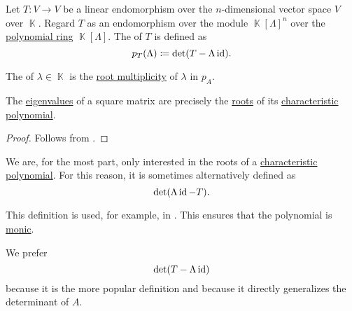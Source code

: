 \begin{definition}\label{def:characteristic_polynomial}\mimprovised
  Let \( T: V \to V \) be a linear endomorphism over the \( n \)-dimensional vector space \( V \) over \( \BbbK \). Regard \( T \) as an endomorphism over the module \( \BbbK[\Lambda]^n \) over the \hyperref[def:polynomial_algebra]{polynomial ring} \( \BbbK[\Lambda] \). The  of \( T \) is defined as
  \begin{equation*}
    p_T(\Lambda) \coloneqq \det(T - \Lambda \operatorname{id}).
  \end{equation*}

  The  of \( \lambda \in \BbbK \) is the \hyperref[def:multiple_root]{root multiplicity} of \( \lambda \) in \( p_A \).
\end{definition}

\begin{proposition}\label{thm:eigenvalues_and_characteristic_polynomials}
  The \hyperref[def:eigenpair]{eigenvalues} of a square matrix are precisely the \hyperref[def:multiple_root]{roots} of its \hyperref[def:characteristic_polynomial]{characteristic polynomial}.
\end{proposition}
\begin{proof}
  Follows from .
\end{proof}

\begin{remark}\label{rem:characteristic_polynomial}
  We are, for the most part, only interested in the roots of a \hyperref[def:characteristic_polynomial]{characteristic polynomial}. For this reason, it is sometimes alternatively defined as
  \begin{equation*}
    \det(\Lambda \operatorname{id} - T).
  \end{equation*}

  This definition is used, for example, in \cite[74]{Knapp2016BasicAlgebra}. This ensures that the polynomial is \hyperref[def:monic_polynomial]{monic}.

  We prefer
  \begin{equation*}
    \det(T - \Lambda \operatorname{id})
  \end{equation*}
  because it is the more popular definition and because it directly generalizes the determinant of \( A \).
\end{remark}

